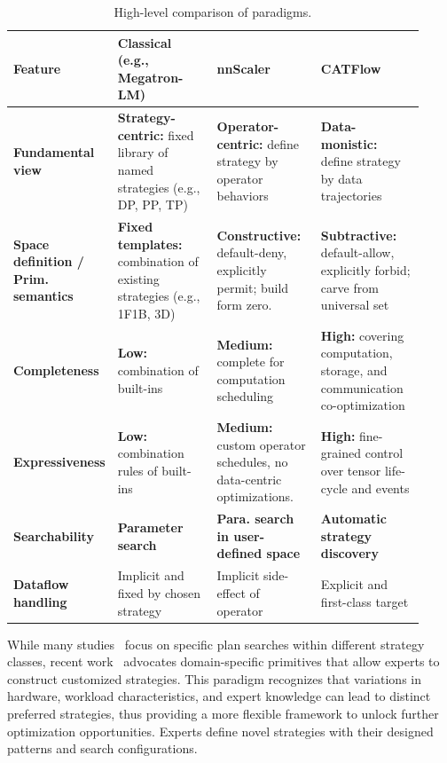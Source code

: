 \documentclass[letterpaper,twocolumn,10pt]{article}
\newcommand{\name}{CATFlow}
\begin{document}
\begin{table}[t!]
\small
\centering
\setlength{\tabcolsep}{4pt}
\caption{High-level comparison of paradigms.}
\label{tab:landscape}
\begin{tabular}{p{0.14\linewidth}p{0.26\linewidth}p{0.26\linewidth}p{0.26\linewidth}}
\toprule
\textbf{Feature} & \textbf{Classical} (e.g., Megatron-LM) & \textbf{nnScaler} & \textbf{\name{}} \\
\midrule
\textbf{Fundamental view} & \textbf{Strategy-centric:} fixed library of named strategies (e.g., DP, PP, TP) & \textbf{Operator-centric:} define strategy by operator behaviors & \textbf{Data-monistic:} define strategy by data trajectories \\
\textbf{Space definition / Prim. semantics} & \textbf{Fixed templates:} combination of existing strategies (e.g., 1F1B, 3D) & \textbf{Constructive:} default-deny, explicitly permit; build form zero. & \textbf{Subtractive:} default-allow, explicitly forbid; carve from universal set\\
\textbf{Completeness} & \textbf{Low:} combination of built-ins & \textbf{Medium:} complete for computation scheduling & \textbf{High:} covering computation, storage, and communication co-optimization \\
\textbf{Expressiveness} & \textbf{Low:} combination rules of built-ins & \textbf{Medium:} custom operator schedules, no data-centric optimizations. & \textbf{High:} fine-grained control over tensor life-cycle and events \\
\textbf{Searchability} & \textbf{Parameter search} & \textbf{Para. search in user-defined space} & \textbf{Automatic strategy discovery} \\
\textbf{Dataflow handling} & Implicit and fixed by chosen strategy & Implicit side-effect of operator & Explicit and first-class target \\
\bottomrule
\end{tabular}
\end{table}

While many studies~\cite{tarnawski2021piper, zheng2022alpa, liu2024aceso} focus on specific plan searches within different strategy classes, recent work~\cite{lin2024nnscaler} advocates domain-specific primitives that allow experts to construct customized strategies. This paradigm recognizes that variations in hardware, workload characteristics, and expert knowledge can lead to distinct preferred strategies, thus providing a more flexible framework to unlock further optimization opportunities. Experts define novel strategies with their designed patterns and search configurations.
\end{document}
